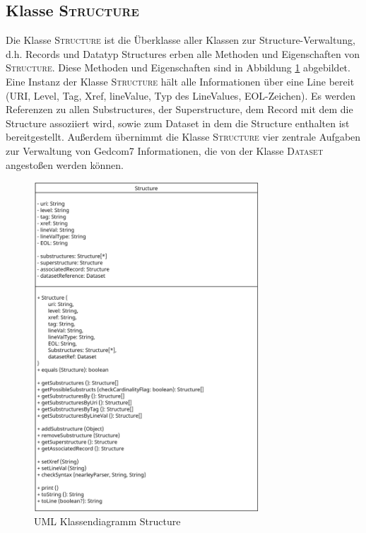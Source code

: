 \subsection{Klasse \textsc{Structure}}
\label{subsec: Implementierung - Gedcom Struktur - Klasse Structure}
Die Klasse \textsc{Structure} ist die Überklasse aller Klassen zur Structure-Verwaltung, d.h. Records und Datatyp Structures erben alle Methoden und Eigenschaften von \textsc{Structure}. Diese Methoden und Eigenschaften sind in Abbildung \ref{fig: UML Klassendiagramm Structure} abgebildet. Eine Instanz der Klasse \textsc{Structure} hält alle Informationen über eine Line bereit (URI, Level, Tag, Xref, lineValue, Typ des LineValues, EOL-Zeichen). Es werden Referenzen zu allen Substructures, der Superstructure, dem Record mit dem die Structure assoziiert wird, sowie zum Dataset in dem die Structure enthalten ist bereitgestellt. Außerdem übernimmt die Klasse \textsc{Structure} vier zentrale Aufgaben zur Verwaltung von Gedcom7 Informationen, die von der Klasse \textsc{Dataset} angestoßen werden können.

\begin{figure}[h]
	\centering
	\includegraphics[width=0.75\textwidth]{images/UML_Class_Structure.png}
	\caption{UML Klassendiagramm Structure}
	\label{fig: UML Klassendiagramm Structure}
\end{figure}

